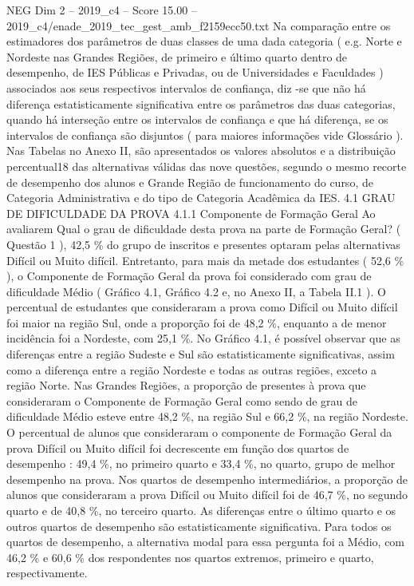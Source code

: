 \begin{textsample}{NEG Dim 2 – 2019\_c4 – Score 15.00 – 2019\_c4/enade\_2019\_tec\_gest\_amb\_f2159ecc50.txt}
Na comparação entre os estimadores dos parâmetros de duas classes de uma dada categoria ( e.g.
Norte e Nordeste nas Grandes Regiões, de primeiro e último quarto dentro de desempenho, de IES Públicas e Privadas, ou de Universidades e Faculdades ) associados aos seus respectivos intervalos de confiança, diz -se que não há diferença estatisticamente significativa entre os parâmetros das duas categorias, quando há interseção entre os intervalos de confiança e que há diferença, se os intervalos de confiança são disjuntos ( para maiores informações vide Glossário ).
Nas Tabelas no Anexo II, são apresentados os valores absolutos e a distribuição percentual18 das alternativas válidas das nove questões, segundo o mesmo recorte de desempenho dos alunos e Grande Região de funcionamento do curso, de Categoria Administrativa e do tipo de Categoria Acadêmica da IES. 4.1 GRAU DE DIFICULDADE DA PROVA 4.1.1 Componente de Formação Geral Ao avaliarem Qual o grau de dificuldade desta prova na parte de Formação Geral? ( Questão 1 ), 42,5 \% do grupo de inscritos e presentes optaram pelas alternativas Difícil ou Muito difícil.
Entretanto, para mais da metade dos estudantes ( 52,6 \% ), o Componente de Formação Geral da prova foi considerado com grau de dificuldade Médio ( Gráfico 4.1, Gráfico 4.2 e, no Anexo II, a Tabela II.1 ).
O percentual de estudantes que consideraram a prova como Difícil ou Muito difícil foi maior na região Sul, onde a proporção foi de 48,2 \%, enquanto a de menor incidência foi a Nordeste, com 25,1 \%.
No Gráfico 4.1, é possível observar que as diferenças entre a região Sudeste e Sul são estatisticamente significativas, assim como a diferença entre a região Nordeste e todas as outras regiões, exceto a região Norte.
Nas Grandes Regiões, a proporção de presentes à prova que consideraram o Componente de Formação Geral como sendo de grau de dificuldade Médio esteve entre 48,2 \%, na região Sul e 66,2 \%, na região Nordeste.
O percentual de alunos que consideraram o componente de Formação Geral da prova Difícil ou Muito difícil foi decrescente em função dos quartos de desempenho : 49,4 \%, no primeiro quarto e 33,4 \%, no quarto, grupo de melhor desempenho na prova.
Nos quartos de desempenho intermediários, a proporção de alunos que consideraram a prova Difícil ou Muito difícil foi de 46,7 \%, no segundo quarto e de 40,8 \%, no terceiro quarto.
As diferenças entre o último quarto e os outros quartos de desempenho são estatisticamente significativa.
Para todos os quartos de desempenho, a alternativa modal para essa pergunta foi a Médio, com 46,2 \% e 60,6 \% dos respondentes nos quartos extremos, primeiro e quarto, respectivamente.

\end{textsample}

